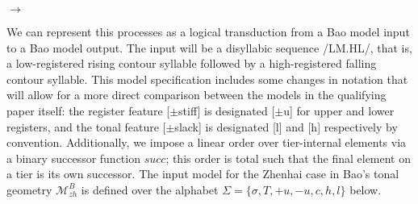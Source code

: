 \documentclass{article}
\begin{document}
\begin{center}
\hspace{.3cm}
$\rightarrow$
\hspace{.3cm}
\end{center}
We can represent this processes as a logical transduction from a Bao model input to a Bao model output. The input will be a disyllabic sequence /LM.HL/, that is, a low-registered rising contour syllable followed by a high-registered falling contour syllable. This model specification includes some changes in notation that will allow for a more direct comparison between the models in the qualifying paper itself: the register feature [$\pm$stiff] is designated [$\pm$u] for upper and lower registers, and the tonal feature [$\pm$slack] is designated [l] and [h] respectively by convention. Additionally, we impose a linear order over tier-internal elements via a binary successor function $succ$; this order is total such that the final element on a tier is its own successor. The input model for the Zhenhai case in Bao's tonal geometry $\mathcal{M}^{B}_{zh}$ is defined over the alphabet $\Sigma = \{\sigma, T, +u, -u, c, h, l\}$ below.
\end{document}
